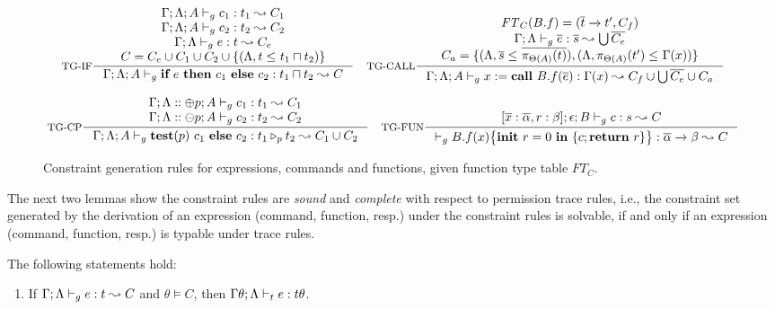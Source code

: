 {{{\begin{figure*}[ht]
\begin{tiny}
\[
\inference[TG-IF]
{
\Gamma;\trace; A \vdash_{g} c_1 : t_1 \leadsto C_1 \\
\Gamma;\trace; A \vdash_{g} c_2 : t_2 \leadsto C_2 \\
\Gamma;\trace \vdash_{g} e : t \leadsto C_e \\
C = C_e\cup C_1\cup C_2 \cup \{(\trace, t \leq_{} t_1\sqcap t_2) \}}
{\Gamma;\trace;  A \vdash_{g} \lcIF{e}{c_1}{c_2} : t_1\sqcap t_2 \leadsto C}
\quad
\inference[TG-CALL]
{
\FT_{C}(B.f) = (\overline{t} \xrightarrow{} t', C_{f})  \\
\Gamma;\trace \vdash_{g} \overline{e} : \overline{s} \leadsto \bigcup \overline{C_{e}} \\
C_{a} = \{(\trace, \overline{s}\leq_{} \overline{\app{t}{\Theta(A)}}), (\trace, \app{t'}{\Theta(A)}\leq_{} \Gamma(x))\} }
{
\Gamma;\trace; A \vdash_{g} \lcCALL{x}{B.f}{\overline{e}} : \Gamma(x)\leadsto C_{f} \cup \bigcup\overline{C_{e}}\cup C_{a}
}
\]

\[
\inference[TG-CP]
{
\Gamma;\trace::\tplus p; A \vdash_{g} c_1 : t_1  \leadsto C_1 \\
 \Gamma;\trace::\tminus p; A \vdash_{g} c_2 : t_2  \leadsto C_2
 }
{\Gamma;\trace; A \vdash_{g} \lcCP{p}{c_1}{c_2} : \omerge{p}{t_1}{t_2} \leadsto C_1\cup C_2}
\quad
\inference[TG-FUN]
{
[\overline{x}: \overline{\alpha},\lpRES:\beta]; \epsilon; B \vdash_{g} c : s  \leadsto C
}
{
\vdash_{g} \lpPROG{B.f}{x}{c}{\lpRES} :  \overline{\alpha}\xrightarrow{} \beta  \leadsto  C
}
\]
\end{tiny}
\caption{Constraint generation rules for expressions, commands and functions, given function type table $FT_C$.}
\label{fig:constraint-rules}
\end{figure*}



 
The next two lemmas show the constraint rules are \emph{sound} and \emph{complete} with respect to permission trace rules, i.e., the constraint set generated by the derivation of an expression (command, function, resp.) under the constraint rules is solvable, if and only if an expression (command, function, resp.) is typable under trace rules.

\begin{lemma}\label{lem:cgrsound}
The following statements hold:
\begin{enumerate}[label={(\alph*)}]
\item\label{lem:cgrsound-1} If $\Gamma;\Lambda \vdash_{g} e : t\leadsto C$ and $\theta \vDash C$, then $\Gamma\theta;\Lambda \vdash_{t} e : t\theta $.


\end{enumerate}
\end{lemma}}}}

